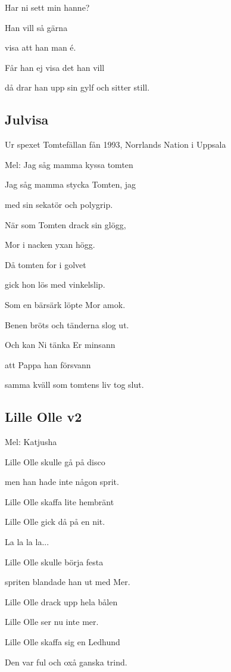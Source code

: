 Har ni sett min hanne?

Han vill så gärna

visa att han man é.

Får han ej visa det han vill

då drar han upp sin gylf och sitter still. 


\subsection{\textbf{Julvisa}}


Ur spexet Tomtefällan fån 1993, Norrlands Nation i Uppsala 

Mel: Jag såg mamma kyssa tomten \bigskip

Jag såg mamma stycka Tomten, jag

med sin sekatör och polygrip.

När som Tomten drack sin glögg,

Mor i nacken yxan högg.

Då tomten for i golvet

gick hon lös med vinkelslip.

Som en bärsärk löpte Mor amok.

Benen bröts och tänderna slog ut.

Och kan Ni tänka Er minsann

att Pappa han försvann

samma kväll som tomtens liv tog slut. 

\subsection{\textbf{Lille Olle v2}}

Mel: Katjusha\bigskip


Lille Olle skulle gå på disco

men han hade inte någon sprit.

Lille Olle skaffa lite hembränt

Lille Olle gick då på en nit.\bigskip


La la la la...\bigskip


Lille Olle skulle börja festa

spriten blandade han ut med Mer.

Lille Olle drack upp hela bålen

Lille Olle ser nu inte mer.\bigskip


Lille Olle skaffa sig en Ledhund

Den var ful och oxå ganska trind.

